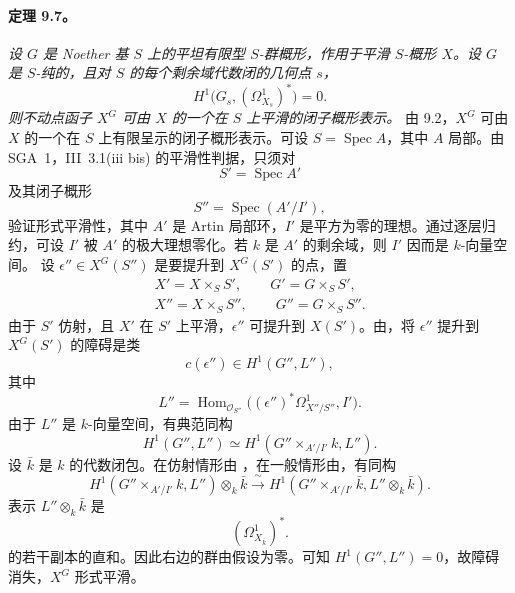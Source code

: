 \paragraph{\textbf{定理 9.7。}}
\emph{设 \(G\) 是 Noether 基 \(S\) 上的平坦有限型 \(S\)-群概形，作用于平滑 \(S\)-概形 \(X\)。设 \(G\) 是 \(S\)-纯的，且对 \(S\) 的每个剩余域代数闭的几何点 \(s\)，}
\[
  H^1\bigl(G_s,(\Omega^1_{X_s})^*\bigr)=0.
\]
\emph{则不动点函子 \(X^G\) 可由 \(X\) 的一个在 \(S\) 上平滑的闭子概形表示。}
由 9.2，\(X^G\) 可由 \(X\) 的一个在 \(S\) 上有限呈示的闭子概形表示。可设 \(S=\operatorname{Spec}A\)，其中 \(A\) 局部。由 SGA~1，III~3.1(iii bis) 的平滑性判据，只须对
\[
  S'=\operatorname{Spec}A'
\]
及其闭子概形
\[
  S''=\operatorname{Spec}(A'/I'),
\]
验证形式平滑性，其中 \(A'\) 是 Artin 局部环，\(I'\) 是平方为零的理想。通过逐层归约，可设 \(I'\) 被 \(A'\) 的极大理想零化。若 \(k\) 是 \(A'\) 的剩余域，则 \(I'\) 因而是 \(k\)-向量空间。
设 \(\epsilon''\in X^G(S'')\) 是要提升到 \(X^G(S')\) 的点，置
\[
\begin{gathered}
  X'=X\times_S S',\qquad G'=G\times_S S',\\
  X''=X\times_S S'',\qquad G''=G\times_S S''.
\end{gathered}
\]
由于 \(S'\) 仿射，且 \(X'\) 在 \(S'\) 上平滑，\(\epsilon''\) 可提升到 \(X(S')\)。由，将 \(\epsilon''\) 提升到 \(X^G(S')\) 的障碍是类
\[
  c(\epsilon'')\in H^1(G'',L''),
\]
其中
\[
  L''=
  \operatorname{Hom}_{\mathcal O_{S''}}
  \bigl((\epsilon'')^*\Omega^1_{X''/S''},I'\bigr).
\]
由于 \(L''\) 是 \(k\)-向量空间，有典范同构
\[
  H^1(G'',L'')
  \simeq
  H^1(G''\times_{A'/I'}k,L'').
\]
设 \(\bar k\) 是 \(k\) 的代数闭包。在仿射情形由 ，在一般情形由，有同构
\[
  H^1(G''\times_{A'/I'}k,L'')\otimes_k\bar k
  \xrightarrow{\ \sim\ }
  H^1(G''\times_{A'/I'}\bar k,L''\otimes_k\bar k).
\]
表示 \(L''\otimes_k\bar k\) 是
\[
  (\Omega^1_{X_{\bar k}})^*.
\]
的若干副本的直和。因此右边的群由假设为零。可知 \(H^1(G'',L'')=0\)，故障碍消失，\(X^G\) 形式平滑。
